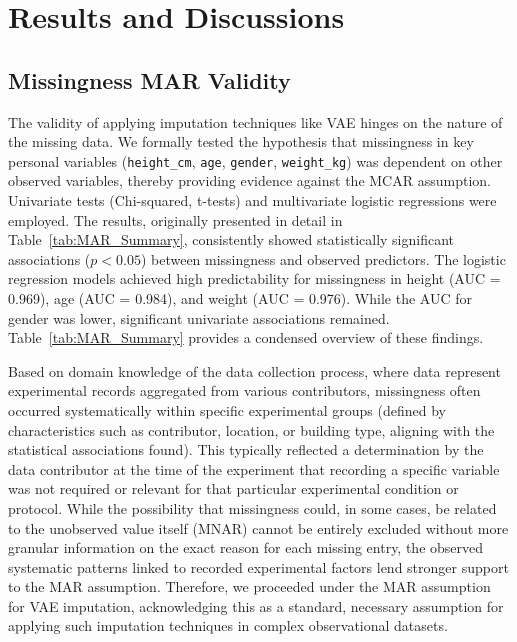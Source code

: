 \section{Results and Discussions}
\subsection{Missingness MAR Validity}

The validity of applying imputation techniques like VAE hinges on the nature of the missing data. We formally tested the hypothesis that missingness in key personal variables (\texttt{height\_cm}, \texttt{age}, \texttt{gender}, \texttt{weight\_kg}) was dependent on other observed variables, thereby providing evidence against the MCAR assumption. Univariate tests (Chi-squared, t-tests) and multivariate logistic regressions were employed. The results, originally presented in detail in Table~\ref{tab:MAR_Summary}, consistently showed statistically significant associations ($p < 0.05$) between missingness and observed predictors. The logistic regression models achieved high predictability for missingness in height (AUC = 0.969), age (AUC = 0.984), and weight (AUC = 0.976). While the AUC for gender was lower, significant univariate associations remained. Table~\ref{tab:MAR_Summary} provides a condensed overview of these findings.

Based on domain knowledge of the data collection process, where data represent experimental records aggregated from various contributors, missingness often occurred systematically within specific experimental groups (defined by characteristics such as contributor, location, or building type, aligning with the statistical associations found). This typically reflected a determination by the data contributor at the time of the experiment that recording a specific variable was not required or relevant for that particular experimental condition or protocol. While the possibility that missingness could, in some cases, be related to the unobserved value itself (MNAR) cannot be entirely excluded without more granular information on the exact reason for each missing entry, the observed systematic patterns linked to recorded experimental factors lend stronger support to the MAR assumption. Therefore, we proceeded under the MAR assumption for VAE imputation, acknowledging this as a standard, necessary assumption for applying such imputation techniques in complex observational datasets\cite{Rubin1976}.

